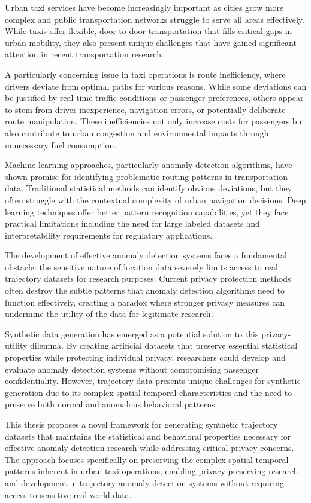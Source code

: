 \documentclass[runningheads]{llncs}
\begin{document}
Urban taxi services have become increasingly important as cities grow more complex and public transportation networks struggle to serve all areas effectively. While taxis offer flexible, door-to-door transportation that fills critical gaps in urban mobility, they also present unique challenges that have gained significant attention in recent transportation research.

A particularly concerning issue in taxi operations is route inefficiency, where drivers deviate from optimal paths for various reasons. While some deviations can be justified by real-time traffic conditions or passenger preferences, others appear to stem from driver inexperience, navigation errors, or potentially deliberate route manipulation. These inefficiencies not only increase costs for passengers but also contribute to urban congestion and environmental impacts through unnecessary fuel consumption.

Machine learning approaches, particularly anomaly detection algorithms, have shown promise for identifying problematic routing patterns in transportation data. Traditional statistical methods can identify obvious deviations, but they often struggle with the contextual complexity of urban navigation decisions. Deep learning techniques offer better pattern recognition capabilities, yet they face practical limitations including the need for large labeled datasets and interpretability requirements for regulatory applications.

The development of effective anomaly detection systems faces a fundamental obstacle: the sensitive nature of location data severely limits access to real trajectory datasets for research purposes. Current privacy protection methods often destroy the subtle patterns that anomaly detection algorithms need to function effectively, creating a paradox where stronger privacy measures can undermine the utility of the data for legitimate research.

Synthetic data generation has emerged as a potential solution to this privacy-utility dilemma. By creating artificial datasets that preserve essential statistical properties while protecting individual privacy, researchers could develop and evaluate anomaly detection systems without compromising passenger confidentiality. However, trajectory data presents unique challenges for synthetic generation due to its complex spatial-temporal characteristics and the need to preserve both normal and anomalous behavioral patterns.

This thesis proposes a novel framework for generating synthetic trajectory datasets that maintains the statistical and behavioral properties necessary for effective anomaly detection research while addressing critical privacy concerns. The approach focuses specifically on preserving the complex spatial-temporal patterns inherent in urban taxi operations, enabling privacy-preserving research and development in trajectory anomaly detection systems without requiring access to sensitive real-world data.
\end{document}
